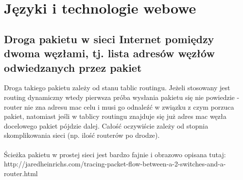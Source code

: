 \chapter{Języki i technologie webowe}
\PartialToc

\section{Droga pakietu w sieci Internet pomiędzy dwoma
węzłami, tj. lista adresów węzłów odwiedzanych przez pakiet}


Droga takiego pakietu zależy od stanu tablic routingu. Jeżeli stosowany jest routing dynamiczny wtedy pierwsza próba wysłania pakietu się nie powiedzie - router nie zna adresu mac celu i musi go odnaleźć w związku z czym porzuca pakiet, natomiast jeśli w tablicy routingu znajduje się już adres mac węzła docelowego pakiet pójdzie dalej. Całość oczywiście zależy od stopnia skomplikowania sieci (np. ilość routerów po drodze).
\\
\\
Ścieżka pakietu w prostej sieci jest bardzo fajnie i obrazowo opisana tutaj:\\
http://jaredheinrichs.com/tracing-packet-flow-between-a-2-switches-and-a-router.html


\vspace{0.4cm}
\noindent 
